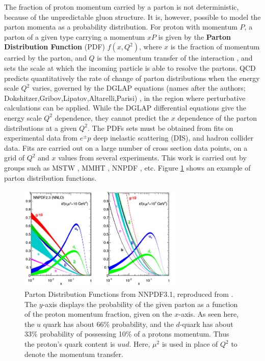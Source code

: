 \documentclass[11pt,a4paper,openright,twoside]{report}
\begin{document}
The fraction of proton momentum carried by a parton is not deterministic, because of the unpredictable gluon structure. It is, however, possible to model the parton momenta as a probability distribution. For proton with momentum $P$, a parton  of a given type carrying a momentum $xP$ is given by the \textbf{Parton Distribution Function} (PDF) $f(x,Q^2)$, where $x$ is the fraction of momentum carried by the parton, and $Q$ is the momentum transfer of the interaction \cite{collider_physics}, and sets the scale at which the incoming particle is able to resolve the partons. QCD predicts quantitatively the rate of change of parton distributions when the energy scale $Q^2$ varies, governed by the DGLAP equations (names after the authors; Dokshitzer,Gribov,Lipatov,Altarelli,Parisi) \cite{DGLAP}, in the region where perturbative calculations can be applied. While the DGLAP differential equations give the energy scale $Q^2$ dependence, they cannot predict the $x$ dependence of the parton distributions at a given $Q^2$. The PDFs sets must be obtained from fits on experimental data from $e^\pm p$ deep inelastic scattering (DIS), and hadron collider data. Fits are carried out on a large number of cross section data points, on a grid of $Q^2$ and $x$ values from several experiments. This work is carried out by groups such as  MSTW \cite{MSTW, MSTW2, MSTW3}, MMHT \cite{MMHT14}, NNPDF \cite{NNPDF}, etc. Figure \ref{fig:NNPDF3} shows an example of parton distribution functions.

\begin{figure}[h]
\centering
\includegraphics[width=0.7\textwidth]{NNPDF3.png}
\caption{Parton Distribution Functions from NNPDF3.1, reproduced from \cite{NNPDF}. The $y$-axis displays the probability of the given parton as a function of the proton momentum fraction, given on the $x$-axis. As seen here, the $u$ quark has about 66\% probability, and the $d$-quark has about 33\% probability of possessing 10\% of a protons momentum. Thus the proton's quark content is $uud$. Here, $\mu^2$ is used in place of $Q^2$ to denote the momentum transfer.}
\label{fig:NNPDF3}
\end{figure}
\end{document}
